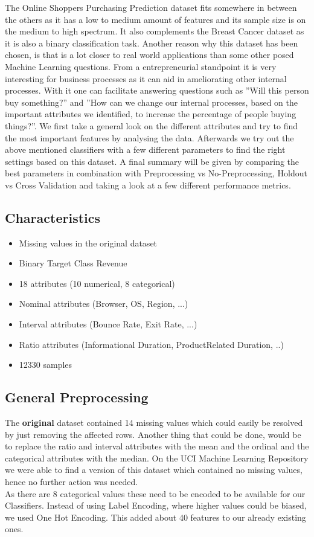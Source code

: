 The Online Shoppers Purchasing Prediction dataset fits somewhere in between the others as it has a low to medium amount of features and its sample size is on the medium to high spectrum. It also complements the Breast Cancer dataset as it is also a binary classification task. Another reason why  this dataset has been chosen, is that is a lot closer to real world applications than some other posed Machine Learning questions. From a entrepreneurial standpoint it is very interesting for business processes as it can aid in ameliorating other internal processes. With it one can facilitate answering questions such as ''Will this person buy something?'' and ''How can we change our internal processes, based on the important attributes we identified, to increase the percentage of people buying things?''. We first take a general look on the different attributes and try to find the most important features by analysing the data. Afterwards we try out the above mentioned classifiers with a few different parameters to find the right settings based on this dataset. A final summary will be given by comparing the best parameters in combination with Preprocessing vs No-Preprocessing, Holdout vs Cross Validation and taking a look at a few different performance metrics.

\subsection{Characteristics}

\begin{itemize}
\item Missing values in the original dataset
\item Binary Target Class Revenue
\item 18 attributes (10 numerical, 8 categorical)
\item Nominal attributes (Browser, OS, Region, ...)
\item Interval attributes (Bounce Rate, Exit Rate, ...)
\item Ratio attributes (Informational Duration, ProductRelated Duration, ..)
\item 12330 samples
\end{itemize}

\subsection{General Preprocessing} \label{GenPrepro}
The \textbf{original} dataset contained 14 missing values which could easily be resolved by just removing the affected rows. Another thing that could be done, would be to replace the ratio and interval attributes with the mean and the ordinal and the categorical attributes with the median. On the UCI Machine Learning Repository we were able to find a version of this dataset which contained no missing values, hence no further action was needed. \\
\newline
As there are 8 categorical values these need to be encoded to be available for our Classifiers. Instead of using Label Encoding, where higher values could be biased, we used One Hot Encoding. This added about 40 features to our already existing ones.

